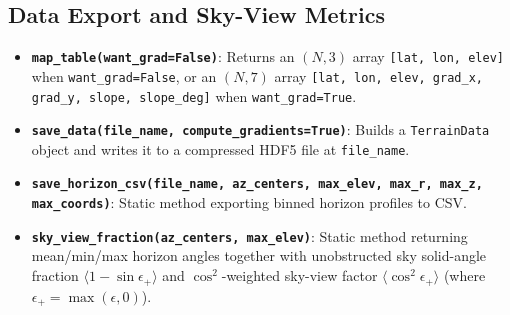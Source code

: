 \documentclass[11pt,letterpaper]{article}
\begin{document}
\subsection{Data Export and Sky-View Metrics}
\begin{itemize}
  \item \textbf{\texttt{map\_table(want\_grad=False)}}: Returns an $(N, 3)$ array \texttt{[lat, lon, elev]} when \texttt{want\_grad=False}, or an $(N, 7)$ array \texttt{[lat, lon, elev, grad\_x, grad\_y, slope, slope\_deg]} when \texttt{want\_grad=True}.
  \item \textbf{\texttt{save\_data(file\_name, compute\_gradients=True)}}: Builds a \texttt{TerrainData} object and writes it to a compressed HDF5 file at \texttt{file\_name}.
  \item \textbf{\texttt{save\_horizon\_csv(file\_name, az\_centers, max\_elev, max\_r, max\_z, max\_coords)}}: Static method exporting binned horizon profiles to CSV.
  \item \textbf{\texttt{sky\_view\_fraction(az\_centers, max\_elev)}}: Static method returning mean/min/max horizon angles together with unobstructed sky solid-angle fraction $\langle 1 - \sin\epsilon_+ \rangle$ and $\cos^2$-weighted sky-view factor $\langle \cos^2\epsilon_+ \rangle$ (where $\epsilon_+ = \max(\epsilon, 0)$).
\end{itemize}
\end{document}

